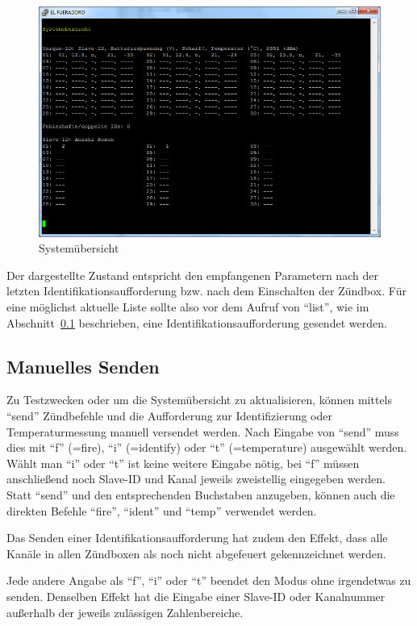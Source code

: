 \documentclass[pdftex, parskip, numbers=noenddot, toc=listof]{scrbook}
\begin{document}
	\begin{figure}
		\centering
		\includegraphics[width=.8\textwidth]{Bilder/list}
		\caption{Systemübersicht}
		\label{fig:list}
	\end{figure}

	Der dargestellte Zustand entspricht den empfangenen Parametern nach der letzten Identifikationsaufforderung bzw. nach dem Einschalten der Zündbox. Für eine möglichst aktuelle Liste sollte also vor dem Aufruf von \enquote{list}, wie im Abschnitt~\ref{sec:manuellessenden} beschrieben, eine Identifikationsaufforderung gesendet werden.


	\subsection{Manuelles Senden}
	\label{sec:manuellessenden}

	Zu Testzwecken oder um die Systemübersicht zu aktualisieren, können mittels \enquote{send} Zündbefehle und die Aufforderung zur Identifizierung oder Temperaturmessung manuell versendet werden. Nach Eingabe von \enquote{send} muss dies mit \enquote{f} (=fire), \enquote{i} (=identify) oder \enquote{t} (=temperature) ausgewählt werden. Wählt man \enquote{i} oder \enquote{t} ist keine weitere Eingabe nötig, bei \enquote{f} müssen anschließend noch Slave-ID und Kanal jeweils zweistellig eingegeben werden. Statt \enquote{send} und den entsprechenden Buchstaben anzugeben, können auch die direkten Befehle \mbox{\enquote{fire}}, \mbox{\enquote{ident}} und \mbox{\enquote{temp}} verwendet werden.

	Das Senden einer Identifikationsaufforderung hat zudem den Effekt, dass alle Kanäle in allen Zündboxen als noch nicht abgefeuert gekennzeichnet werden.

	Jede andere Angabe als \enquote{f}, \enquote{i} oder \enquote{t} beendet den Modus ohne irgendetwas zu senden. Denselben Effekt hat die Eingabe einer Slave-ID oder Kanalnummer außerhalb der jeweils zulässigen Zahlenbereiche.
\end{document}
